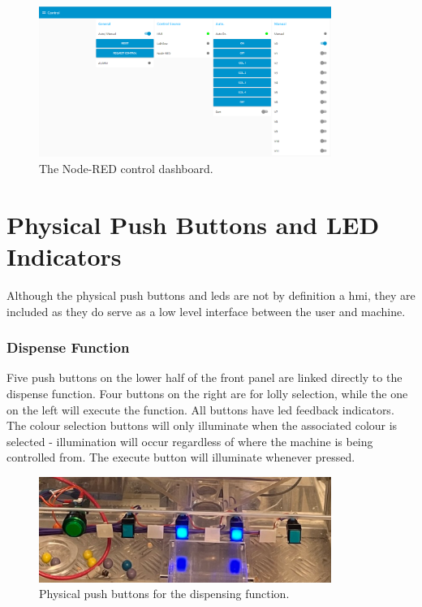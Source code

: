         \begin{figure}[H]
            \centering
            \includegraphics[width = 0.85\textwidth]{2_images/nodeRedControl}
            \caption{The Node-RED control dashboard.}
            \label{fig:nodeRedControl}
        \end{figure}  
        
\section{Physical Push Buttons and LED Indicators}
    Although the physical push buttons and \acrshort{led}s are not by definition a \acrshort{hmi}, they are included as they do serve as a low level interface between the user and machine.

    \subsubsection{Dispense Function}
        Five push buttons on the lower half of the front panel are linked directly to the dispense function. Four buttons on the right are for lolly selection, while the one on the left will execute the function. All buttons have \acrshort{led} feedback indicators. The colour selection buttons will only illuminate when the associated colour is selected - illumination will occur regardless of where the machine is being controlled from. The execute button will illuminate whenever pressed.

        \begin{figure}[H]
            \centering
            \includegraphics[width = 0.85\textwidth]{2_images/physicalPushButtons}
            \caption{Physical push buttons for the dispensing function.}
            \label{fig:physicalPushButtons}
        \end{figure}          

